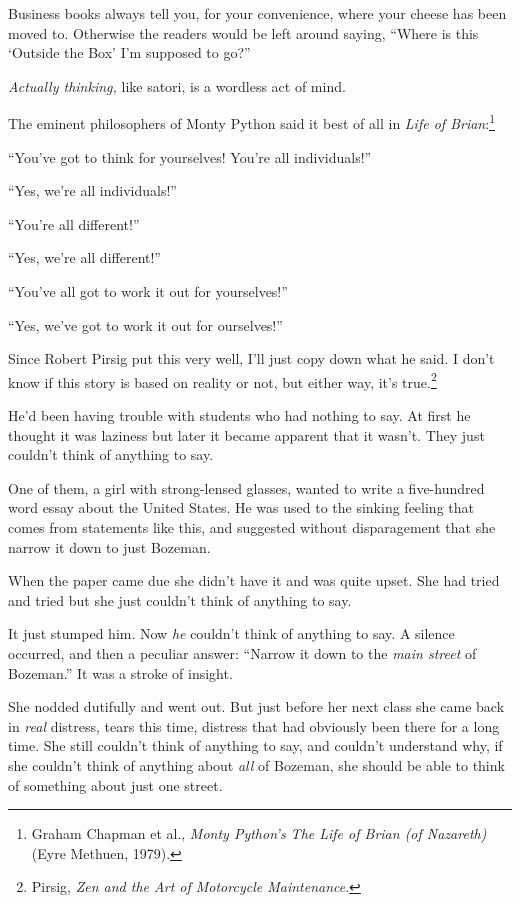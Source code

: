 {
 Business books always tell you, for your convenience, where your
cheese has been moved to. Otherwise the readers would be left around
saying, ``Where is this `Outside the
Box' I'm supposed to
go?''}

{
 \textit{Actually thinking,} like satori, is a wordless act of
mind.}

{
 The eminent philosophers of Monty Python said it best of all in
\textit{Life of Brian}:\footnote{Graham Chapman et al., \textit{Monty Python's
The Life of Brian (of Nazareth)} (Eyre Methuen, 1979).}}

{
 ``You've got to think for
yourselves! You're all
individuals!''}

{
 ``Yes, we're all
individuals!''}

{
 ``You're all
different!''}

{
 ``Yes, we're all
different!''}

{
 ``You've all got to work it out
for yourselves!''}

{
 ``Yes, we've got to work it out
for ourselves!''}

\myendsectiontext


\bigskip


{
 Since Robert Pirsig put this very well, I'll just
copy down what he said. I don't know if this story is
based on reality or not, but either way, it's
true.\footnote{Pirsig, \textit{Zen and the Art of Motorcycle Maintenance}.}}

{
 He'd been having trouble with students who had
nothing to say. At first he thought it was laziness but later it became
apparent that it wasn't. They just
couldn't think of anything to say.}

{
 One of them, a girl with strong-lensed glasses, wanted to write a
five-hundred word essay about the United States. He was used to the
sinking feeling that comes from statements like this, and suggested
without disparagement that she narrow it down to just Bozeman.}

{
 When the paper came due she didn't have it and was
quite upset. She had tried and tried but she just
couldn't think of anything to say.}

{
 It just stumped him. Now \textit{he} couldn't
think of anything to say. A silence occurred, and then a peculiar
answer: ``Narrow it down to the \textit{main street}
of Bozeman.'' It was a stroke of insight.}

{
 She nodded dutifully and went out. But just before her next class
she came back in \textit{real} distress, tears this time, distress that
had obviously been there for a long time. She still
couldn't think of anything to say, and
couldn't understand why, if she
couldn't think of anything about \textit{all} of
Bozeman, she should be able to think of something about just one
street.}

